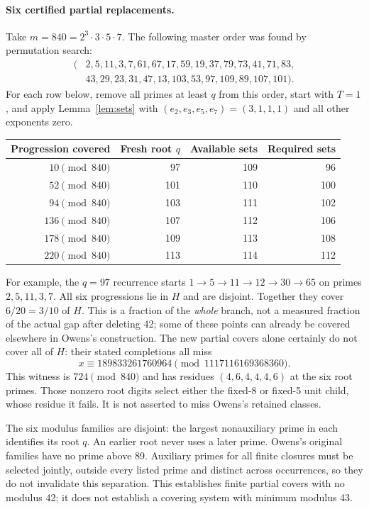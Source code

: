 \documentclass[11pt]{article}
\begin{document}
\paragraph{Six certified partial replacements.}
Take $m=840=2^3\cdot3\cdot5\cdot7$. The following master order was found
by permutation search:
\begin{align*}
(&2,5,11,3,7,61,67,17,59,19,37,79,73,41,71,83,\\
 &43,29,23,31,47,13,103,53,97,109,89,107,101).
\end{align*}
For each row below, remove all primes at least $q$ from this order,
start with $T=1$, and apply Lemma~\ref{lem:sets} with
$(e_2,e_3,e_5,e_7)=(3,1,1,1)$ and all other exponents zero.
\begin{center}
\begin{tabular}{rrrr}
\toprule
Progression covered & Fresh root $q$ & Available sets & Required sets\\
\midrule
$10\pmod{840}$ & 97 & 109 & 96\\
$52\pmod{840}$ & 101 & 110 & 100\\
$94\pmod{840}$ & 103 & 111 & 102\\
$136\pmod{840}$ & 107 & 112 & 106\\
$178\pmod{840}$ & 109 & 113 & 108\\
$220\pmod{840}$ & 113 & 114 & 112\\
\bottomrule
\end{tabular}
\end{center}
For example, the $q=97$ recurrence starts
$1\to5\to11\to12\to30\to65$ on primes $2,5,11,3,7$.
All six progressions lie in $H$ and are disjoint. Together they cover
$6/20=3/10$ of $H$. This is a fraction of the \emph{whole} branch,
not a measured fraction of the actual gap after deleting 42; some of
these points can already be covered elsewhere in Owens's construction.
The new partial covers alone certainly do not cover all of $H$: their
stated completions all miss
\[
 x\equiv189833261760964\pmod{1117116169368360}.
\]
This witness is $724\pmod{840}$ and has residues
$(4,6,4,4,4,6)$ at the six root primes. Those nonzero root digits select
either the fixed-8 or fixed-5 unit child, whose residue it fails.
It is not asserted to miss Owens's retained classes.

The six modulus families are disjoint: the largest nonauxiliary prime in
each identifies its root $q$. An earlier root never uses a later prime.
Owens's original families have no prime above 89. Auxiliary primes for all
finite closures must be selected jointly, outside every listed prime and
distinct across occurrences, so they do not invalidate this separation.
This establishes finite partial covers with no modulus 42; it does not
establish a covering system with minimum modulus 43.
\end{document}

